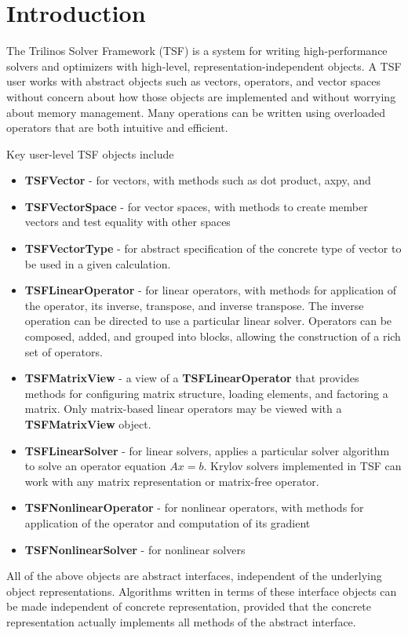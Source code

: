 \chapter{Introduction}

The Trilinos Solver Framework (TSF) is a system for writing 
high-performance
solvers and optimizers with high-level, representation-independent objects. 
A TSF user works with abstract objects such as vectors, operators, and vector spaces
without concern about how those objects are implemented and without worrying about
memory management. Many operations can be written using overloaded operators that are
both intuitive and efficient. 

Key user-level TSF objects include
\begin{itemize} 
\item {\bf TSFVector} - for vectors, with methods such as dot product, axpy, and 
\item {\bf TSFVectorSpace} - for vector spaces, with methods to create member vectors
and test equality with other spaces
\item {\bf TSFVectorType} - for abstract specification of the concrete type of vector
to be used in a given calculation. 
\item {\bf TSFLinearOperator} - for linear operators, with methods for application of
the operator, its inverse, transpose, and inverse transpose. The inverse operation can
be directed to use a particular linear solver. Operators can be composed, added, 
and grouped into blocks, allowing the construction of a rich set of operators.
\item {\bf TSFMatrixView} - a view of a {\bf TSFLinearOperator} that provides
methods for configuring matrix structure, loading elements, and factoring a matrix. 
Only matrix-based linear operators may be viewed with a {\bf TSFMatrixView} object.
\item {\bf TSFLinearSolver} - for linear solvers, applies a particular solver algorithm
to solve an operator equation $A x = b$. Krylov solvers implemented in TSF can work
with any matrix representation or matrix-free operator. 
\item {\bf TSFNonlinearOperator} - for nonlinear operators, with methods for 
application of the operator and computation of its gradient
\item {\bf TSFNonlinearSolver} - for nonlinear solvers
\end{itemize}
All of the above objects are abstract interfaces, independent of the underlying
object representations. Algorithms written in terms of these interface objects
can be made independent of concrete representation, provided that the concrete
representation actually implements all methods of the abstract interface. 







